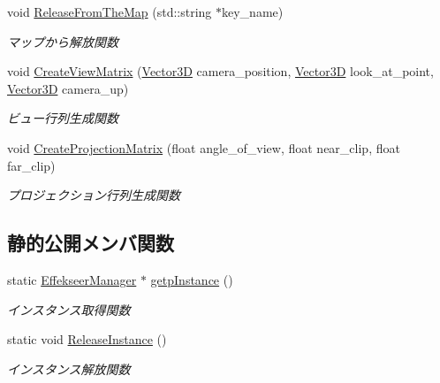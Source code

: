 \begin{DoxyCompactItemize}
void \mbox{\hyperlink{class_effekseer_manager_a27e18219dc771e9d3cb6acb06b273ae8}{Release\+From\+The\+Map}} (std\+::string $\ast$key\+\_\+name)
\begin{DoxyCompactList}\small\item\em マップから解放関数 \end{DoxyCompactList}\item 
void \mbox{\hyperlink{class_effekseer_manager_ade38e35f1b12be29c0601cf4a9da4b65}{Create\+View\+Matrix}} (\mbox{\hyperlink{class_vector3_d}{Vector3D}} camera\+\_\+position, \mbox{\hyperlink{class_vector3_d}{Vector3D}} look\+\_\+at\+\_\+point, \mbox{\hyperlink{class_vector3_d}{Vector3D}} camera\+\_\+up)
\begin{DoxyCompactList}\small\item\em ビュー行列生成関数 \end{DoxyCompactList}\item 
void \mbox{\hyperlink{class_effekseer_manager_a3912b786ddd6fd3ce2f32bab099c6312}{Create\+Projection\+Matrix}} (float angle\+\_\+of\+\_\+view, float near\+\_\+clip, float far\+\_\+clip)
\begin{DoxyCompactList}\small\item\em プロジェクション行列生成関数 \end{DoxyCompactList}\end{DoxyCompactItemize}
\subsection*{静的公開メンバ関数}
\begin{DoxyCompactItemize}
\item 
static \mbox{\hyperlink{class_effekseer_manager}{Effekseer\+Manager}} $\ast$ \mbox{\hyperlink{class_effekseer_manager_a51e3d2d397a8eb9514dcd072dfc35194}{getp\+Instance}} ()
\begin{DoxyCompactList}\small\item\em インスタンス取得関数 \end{DoxyCompactList}\item 
static void \mbox{\hyperlink{class_effekseer_manager_ab9a9bb4622d8f7d326b84741f444c419}{Release\+Instance}} ()
\begin{DoxyCompactList}\small\item\em インスタンス解放関数 \end{DoxyCompactList}\end{DoxyCompactItemize}

